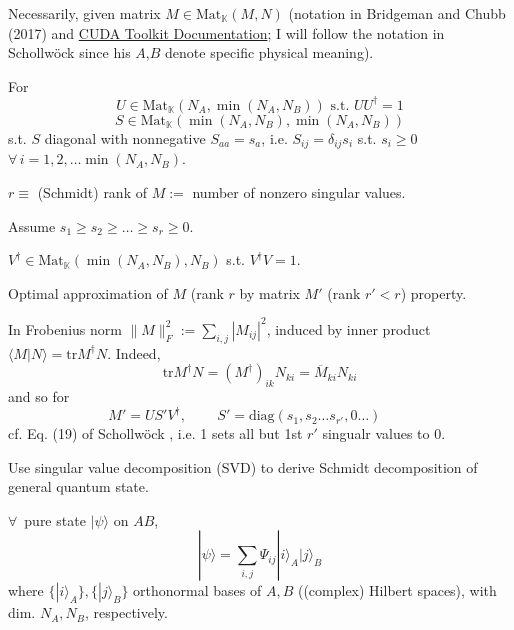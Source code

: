 \documentclass[10pt]{amsart}
\begin{document}
\begin{multicols*}{2}
Necessarily, given matrix $M\in \text{Mat}_{\mathbb{K}}(M,N)$ (notation in Bridgeman and Chubb (2017) \cite{BrCh2017} and \href{http://docs.nvidia.com/cuda/cusolver/index.html}{CUDA Toolkit Documentation}; I will follow the notation in Schollw\"{o}ck \cite{Scho2010} since his $A$,$B$ denote specific physical meaning).  

For 
\[
U\in \text{Mat}_{\mathbb{K}}(N_A, \min{(N_A,N_B)}) \text{ s.t. } UU^{\dag}=1
\]
\[
S \in \text{Mat}_{\mathbb{K}}(\min{(N_A,N_B)}, \min{(N_A,N_B)} )
\]
s.t. $S$ diagonal with nonnegative $S_{aa} = s_a$, i.e. $S_{ij} = \delta_{ij}s_i$ s.t. $s_i\geq 0$ \, $\forall \, i = 1,2, \dots \min{(N_A,N_B)}$.  

$r\equiv $ (Schmidt) rank of $M :=$ number of nonzero singular values.  

Assume $s_1\geq s_2 \geq \dots \geq s_r \geq 0$.  

$V^{\dag} \in \text{Mat}_{\mathbb{K}}(\min{(N_A,N_B)},N_B)$ s.t. $V^{\dag}V=1$.  


Optimal approximation of $M$ (rank $r$ by matrix $M'$ (rank $r' <r$) property.  

In Frobenius norm $\| M \|_F^2 := \sum_{i,j} |M_{ij}|^2$, induced by inner product $\langle M | N \rangle =\text{tr}M^{\dag}N$.  Indeed, 
\[
\text{tr}M^{\dag}N = (M^{\dag})_{ik} N_{ki} = \overline{M}_{ki} N_{ki}
\]
and so for 
\begin{equation}
M'=US'V^{\dag}, \qquad \, S'=\text{diag}(s_1,s_2 \dots s_{r'}, 0 \dots ) \qquad \,
\end{equation}
cf. Eq. (19) of Schollw\"{o}ck \cite{Scho2010}, i.e. 1 sets all but 1st $r'$ singualr values to $0$.  

Use singular value decomposition (SVD) to derive Schmidt decomposition of general quantum state. 

$\forall \, $ pure state $|\psi \rangle$ on $AB$, 
\[
|\psi \rangle = \sum_{i,j} \Psi_{ij}|i\rangle_A |j\rangle_B
\]
where $\lbrace |i\rangle_A \rbrace, \lbrace |j\rangle_B \rbrace$ orthonormal bases of $A,B$ ((complex) Hilbert spaces), with dim. $N_A,N_B$, respectively.  


\end{multicols*}
\end{document}

